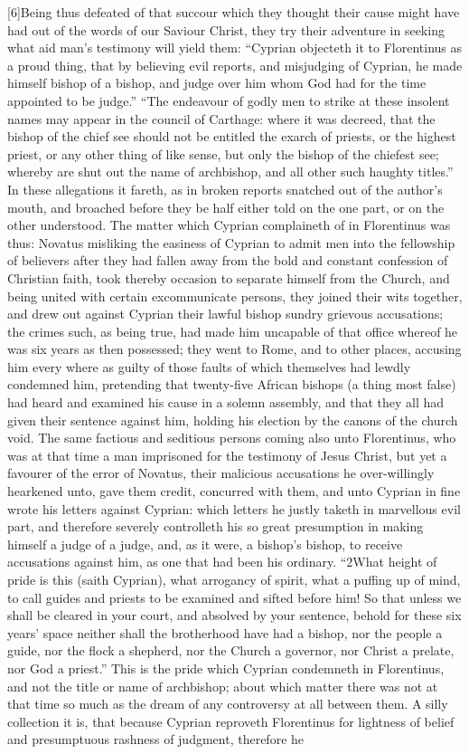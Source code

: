 [6]Being thus defeated of that succour which they thought their cause might have had out of the words of our Saviour Christ, they try their adventure in seeking what  aid man’s testimony will yield them: “Cyprian objecteth it to Florentinus as a proud thing, that by believing evil reports, and misjudging of Cyprian, he made himself bishop of a bishop, and judge over him whom God had for the time appointed to be judge.” “The endeavour of godly men to strike at these insolent names may appear in the council of Carthage: where it was decreed, that the bishop of the chief see should not be entitled the exarch of priests, or the highest priest, or any other thing of like sense, but only the bishop of the chiefest see; whereby are shut out the name of archbishop, and all other such haughty titles.” In these allegations it fareth, as in broken reports snatched out of the author’s mouth, and broached before they be half either told on the one part, or on the other understood. The matter which Cyprian complaineth of in Florentinus was thus: Novatus misliking the easiness of Cyprian to admit men into the fellowship of believers after they had fallen away from the bold and constant confession of Christian faith, took thereby occasion to separate himself from the Church, and being united with certain excommunicate persons, they joined their wits together, and drew out against Cyprian their lawful bishop sundry grievous accusations; the crimes such, as being true, had made him uncapable of that office whereof he was six years as then possessed; they went to Rome, and to other places, accusing him every where as guilty of those faults of which themselves had lewdly condemned him, pretending that twenty-five African bishops (a thing most false) had heard and examined his  cause in a solemn assembly, and that they all had given their sentence against him, holding his election by the canons of the church void. The same factious and seditious persons coming also unto Florentinus, who was at that time a man imprisoned for the testimony of Jesus Christ, but yet a favourer of the error of Novatus, their malicious accusations he over-willingly hearkened unto, gave them credit, concurred with them, and unto Cyprian in fine wrote his letters against Cyprian: which letters he justly taketh in marvellous evil part, and therefore severely controlleth his so great presumption in making himself a judge of a judge, and, as it were, a bishop’s bishop, to receive accusations against him, as one that had been his ordinary. “2What height of pride is this (saith Cyprian), what arrogancy of spirit, what a puffing up of mind, to call guides and priests to be examined and sifted before him! So that unless we shall be cleared in your court, and absolved by your sentence, behold for these six years’ space neither shall the brotherhood have had a bishop, nor the people a guide, nor the flock a shepherd, nor the Church a governor, nor Christ a prelate, nor God a priest.” This is the pride which Cyprian condemneth in Florentinus, and not the title or name of archbishop; about which matter there was not at that time so much as the dream of any controversy at all between them. A silly collection it is, that because Cyprian reproveth Florentinus for lightness of belief and presumptuous rashness of judgment, therefore he 